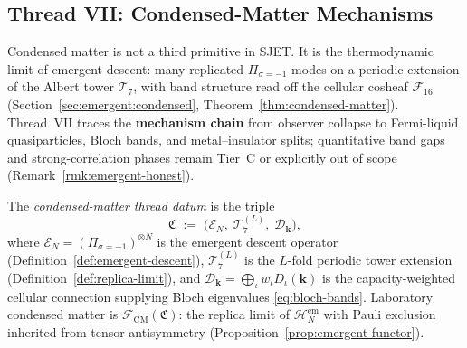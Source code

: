 \subsection{Thread VII: Condensed-Matter Mechanisms}
\label{sec:thread-7}

Condensed matter is not a third primitive in SJET. It is the thermodynamic
limit of emergent descent: many replicated $\Pi_{\sigma=-1}$ modes on a
periodic extension of the Albert tower $\mathcal{T}_7$, with band structure
read off the cellular cosheaf $\mathcal{F}_{16}$
(Section~\ref{sec:emergent:condensed},
Theorem~\ref{thm:condensed-matter}). Thread~VII traces the \textbf{mechanism
chain} from observer collapse to Fermi-liquid quasiparticles, Bloch bands, and
metal--insulator splits; quantitative band gaps and strong-correlation phases
remain Tier~C or explicitly out of scope (Remark~\ref{rmk:emergent-honest}).

\begin{definition}\label{def:thread-7}
The \emph{condensed-matter thread datum} is the triple
\begin{equation}\label{eq:thread-7-datum}
  \mathfrak{C}
  \;:=\;
  \bigl(
    \mathcal{E}_N,\;
    \mathcal{T}_7^{(L)},\;
    \mathcal{D}_{\mathbf{k}}
  \bigr),
\end{equation}
where $\mathcal{E}_N=(\Pi_{\sigma=-1})^{\otimes N}$ is the emergent descent
operator (Definition~\ref{def:emergent-descent}),
$\mathcal{T}_7^{(L)}$ is the $L$-fold periodic tower extension
(Definition~\ref{def:replica-limit}), and
$\mathcal{D}_{\mathbf{k}}=\bigoplus_\iota w_\iota D_\iota(\mathbf{k})$ is the
capacity-weighted cellular connection supplying Bloch eigenvalues
\eqref{eq:bloch-bands}. Laboratory condensed matter is
$\mathcal{F}_{\mathrm{CM}}(\mathfrak{C})$: the replica limit of
$\mathcal{H}_N^{\mathrm{em}}$ with Pauli exclusion inherited from tensor
antisymmetry (Proposition~\ref{prop:emergent-functor}).
\end{definition}

